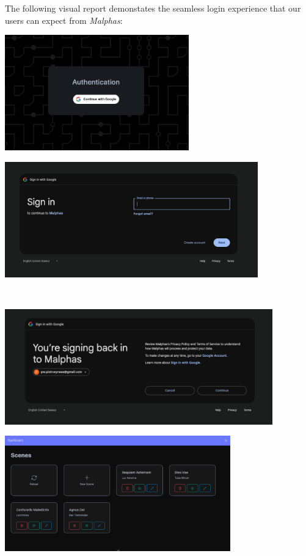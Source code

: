 The following visual report demonstates the seamless login experience that our users can expect from \textit{Malphas}:\\[2\baselineskip]
\begin{minipage}{.5\textwidth}%
	\centering%
	\includegraphics[height=5cm]{assets/auth_page.png}%
\end{minipage}%
\begin{minipage}{.5\textwidth}%
	\centering%
	\includegraphics[height=5cm]{assets/sign_in.png}%
\end{minipage}\\[\baselineskip]
\begin{minipage}{.5\textwidth}%
	\centering%
	\includegraphics[height=5cm]{assets/signing_back_in.png}%
\end{minipage}%
\begin{minipage}{.5\textwidth}%
	\centering%
	\includegraphics[height=5cm]{assets/dash.png}%
\end{minipage}
